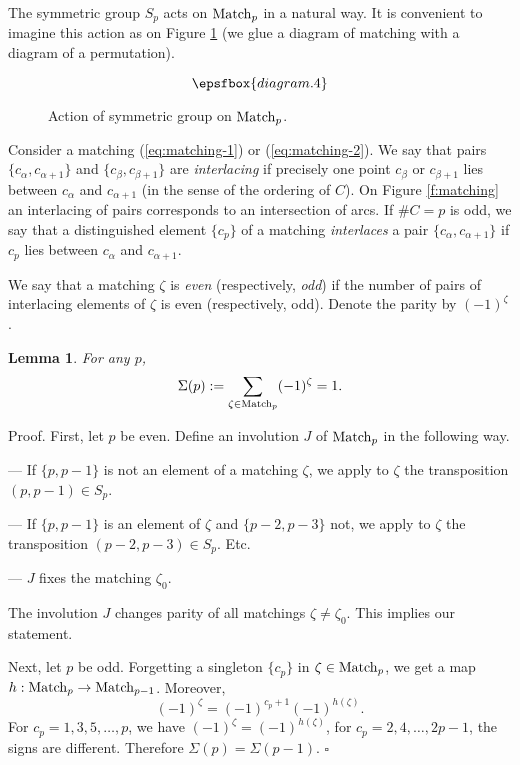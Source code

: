 \documentclass{article}
\newcounter{sec}
\def\sm{\smallskip}
\newtheorem{lemma}[theorem]{Lemma}
\begin{document}
 The symmetric group $S_p$ acts on $\mathrm {Match}_p$ 
in a natural way. It is convenient to imagine 
this action as on Figure \ref{f:action} (we glue a diagram of matching
with a diagram of a permutation).

\begin{figure}
$$
\epsfbox{diagram.4}
$$
\caption{Action of symmetric group on $\mathrm {Match}_p$.\label{f:action}}
\end{figure}

Consider a matching (\ref{eq:matching-1}) or (\ref{eq:matching-2}). We say that pairs 
$\{c_\alpha, c_{\alpha+1}\}$ and $\{c_\beta, c_{\beta+1}\}$ are {\it interlacing}
if precisely one point $c_\beta$ or $c_{\beta+1}$ lies between
$c_\alpha$ and $c_{\alpha+1}$ (in the sense of the ordering of $C$). On Figure \ref{f:matching}
an interlacing of pairs corresponds to an intersection of arcs.
If $\#C=p$ is odd, we say that a distinguished element $\{c_{p}\}$
of a matching {\it interlaces} a pair $\{c_\alpha, c_{\alpha+1}\}$
if $c_{p}$ lies between $c_\alpha$ and  $c_{\alpha+1}$.

We say that a matching $\zeta$ is {\it even} (respectively, {\it odd})
if the number of pairs of interlacing elements of $\zeta$ is even (respectively, odd).
Denote the parity by $(-1)^\zeta$.

\begin{lemma}
	For any $p$,
	\begin{equation}
\Sigma(p):=	\sum_{\zeta\in\mathrm {Match}_p} (-1)^\zeta=1.
\label{eq:1111}
	\end{equation}
\end{lemma}

{\sc Proof.} First, let $p$ be even.
 Define an involution $J$ of $\mathrm {Match}_p$ in the following way.
 
 \sm
 
 --- If $\{p,p-1\}$ is not an element of a matching $\zeta$, we apply to $\zeta$ the transposition
 $(p,p-1)\in S_p$.
 
 \sm
 
 --- If $\{p,p-1\}$ is an element of $\zeta$ and $\{p-2,p-3\}$ not, we apply to $\zeta$ the transposition
 $(p-2,p-3)\in S_p$. Etc.
 
 \sm
 
 --- $J$ fixes the matching $\zeta_0$.
 
 \sm
 
 The involution $J$ changes parity of all matchings $\zeta\ne \zeta_0$. This implies our statement.
 
 Next, let $p$ be odd. Forgetting a singleton $\{c_p\}$ in $\zeta\in\mathrm {Match}_p$, we get a map 
 $h:\mathrm {Match}_p\to\mathrm {Match}_{p-1}$.
  Moreover,
 $$
 (-1)^{\zeta}=(-1)^{c_p+1} (-1)^{h(\zeta)}
 .
 $$
For $c_p=1,3,5,\dots, p$, we have $ (-1)^{\zeta}=(-1)^{h(\zeta)}$,
for $c_p=2,4,\dots, 2p-1$, the signs are different.
Therefore $\Sigma(p)=\Sigma(p-1)$.
\hfill $\square$
\end{document}
